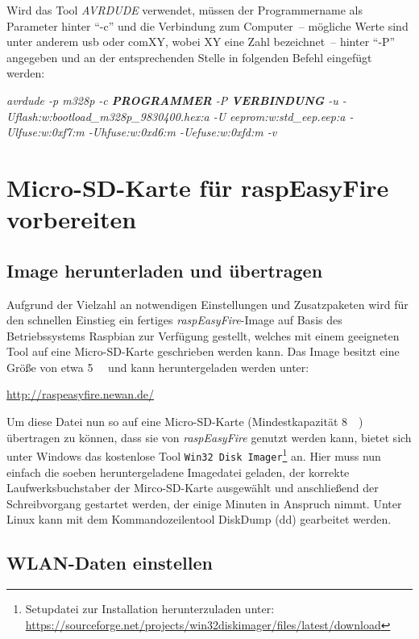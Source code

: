 \documentclass[paper=a4, parskip, numbers=noenddot, toc=listof, headsepline]{scrbook}
\newcommand{\REF}{\emph{raspEasyFire}}
\begin{document}
			Wird das Tool \emph{AVRDUDE} verwendet, müssen der Programmername als Parameter hinter \enquote{-c} und die Verbindung zum Computer~-- mögliche Werte sind unter anderem usb oder comXY, wobei XY eine Zahl bezeichnet~-- hinter \enquote{-P} angegeben und an der entsprechenden Stelle in folgenden Befehl eingefügt werden:
			
			\begin{center}
				\emph{avrdude -p m328p -c \textbf{PROGRAMMER} -P \textbf{VERBINDUNG} -u -Uflash:w:bootload\_m328p\_9830400.hex:a -U eeprom:w:std\_eep.eep:a -Ulfuse:w:0xf7:m -Uhfuse:w:0xd6:m -Uefuse:w:0xfd:m -v}
			\end{center}


	\chapter{Micro-SD-Karte für raspEasyFire vorbereiten}
		\label{ch:raspisd}

		\section{Image herunterladen und übertragen}
			Aufgrund der Vielzahl an notwendigen Einstellungen und Zusatzpaketen wird für den schnellen Einstieg ein fertiges {\REF}-Image auf Basis des Betriebssystems Raspbian zur Verfügung gestellt, welches mit einem geeigneten Tool auf eine Micro-SD-Karte geschrieben werden kann. Das Image besitzt eine Größe von etwa \SI{5}{\giga\byte} und kann heruntergeladen werden unter:
			\begin{center}
				\url{http://raspeasyfire.newan.de/}
			\end{center}

			Um diese Datei nun so auf eine Micro-SD-Karte (Mindestkapazität \SI{8}{\giga\byte}) übertragen zu können, dass sie von {\REF} genutzt werden kann, bietet sich unter Windows das kostenlose Tool \texttt{Win32 Disk Imager}\footnote{Setupdatei zur Installation herunterzuladen unter: \url{https://sourceforge.net/projects/win32diskimager/files/latest/download}} an. Hier muss nun einfach die soeben heruntergeladene Imagedatei geladen, der korrekte Laufwerksbuchstaber der Mirco-SD-Karte ausgewählt und anschließend der Schreibvorgang gestartet werden, der einige Minuten in Anspruch nimmt. Unter Linux kann mit dem Kommandozeilentool DiskDump (dd) gearbeitet werden.

		\section{WLAN-Daten einstellen}
\end{document}

